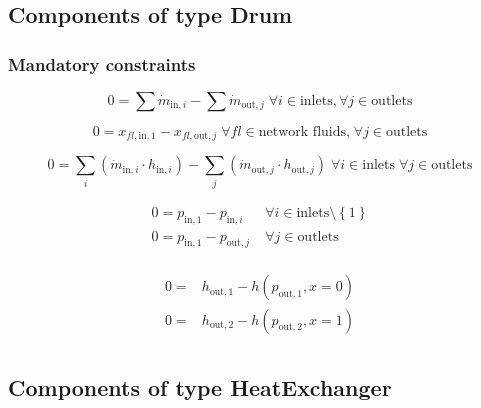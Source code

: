 \subsection{Components of type Drum}

\subsubsection{Mandatory constraints}

\begin{equation}
\label{eq:Drum_mass_flow_constraints}
0 =\sum\dot{m}_{\mathrm{in},i}-\sum\dot{m}_{\mathrm{out},j}\;\forall i \in \text{inlets}, \forall j \in \text{outlets}
\end{equation}

\begin{equation}
\label{eq:Drum_fluid_constraints}
0 = x_{fl\mathrm{,in,1}} - x_{fl\mathrm{,out,}j}\; \forall fl \in \text{network fluids,} \; \forall j \in\text{outlets}
\end{equation}

\begin{equation}
\label{eq:Drum_energy_balance_constraints}
0=\sum_i\left(\dot{m}_{\mathrm{in,}i}\cdot h_{\mathrm{in,}i}\right) - \sum_j \left(\dot{m}_{\mathrm{out,}j} \cdot h_{\mathrm{out,}j} \right) \; \forall i \in \text{inlets} \;\forall j \in \text{outlets}
\end{equation}

\begin{equation}
\label{eq:Drum_pressure_constraints}
\begin{split}
0 = p_\mathrm{in,1} - p_{\mathrm{in,}i} & \; \forall i \in \text{inlets} \setminus \left\lbrace 1\right\rbrace\\
0 = p_\mathrm{in,1} - p_{\mathrm{out,}j} & \; \forall j \in \text{outlets}\\
\end{split}
\end{equation}

\begin{equation}
\label{eq:Drum_outlet_constraints}
\begin{split}
0 =&h_\mathrm{out,1} -h\left(p_\mathrm{out,1}, x=0\right)\\0 =&h_\mathrm{out,2} -h\left(p_\mathrm{out,2}, x=1\right)\\\end{split}
\end{equation}


\subsection{Components of type HeatExchanger}

